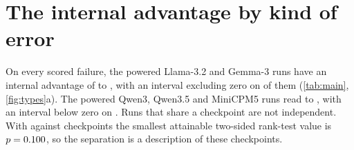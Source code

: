 \section{The internal advantage by kind of error}
\label{sec:result}

\begin{table}[t]
\centering
\footnotesize
\setlength{\tabcolsep}{1.5pt}
\caption{Every run under the corrected labels. $n_+$ and $n_-$ are the labelled failures and valid calls in the scored population. The AUC columns are the length floor, the mean log-probability (conf.), the output-only judge, the Qwen3.5-0.8B reader and the token-role probe, all on every scored failure. The last four columns are differences of AUC on held-out tools: probe minus confidence on every scored failure with its 95\% tool-resampled interval, probe minus the output-only judge on every scored failure, and probe minus confidence on wrong argument values and on dropped parallel calls within the parallel categories, each against valid calls. $^{\circ}$ the interval excludes zero (intervals in \cref{app:judges,app:types}). n.c.\ not computed: too few failures of that kind or of valid parallel calls, an underpowered run, or a comparator not fitted on that run. $^{*}$ re-extracted under the corrected extractor. $^\dagger$ fewer than thirty items of one class.}
\label{tab:main}

\end{table}

On every scored failure, the \nRunsInternals{} powered Llama-3.2 and Gemma-3 runs have an internal advantage of \gapInternalsMin{} to \gapInternalsMax{}, with an interval excluding zero on \nInternalsCiExcludesZero{} of them (\cref{tab:main}, \cref{fig:types}a). The \nRunsConfidence{} powered Qwen3, Qwen3.5 and MiniCPM5 runs read \gapConfidenceMin{} to \gapConfidenceMax{}, with an interval below zero on \nConfidenceCiBelowZero{}. Runs that share a checkpoint are not independent. With \nCkptInternals{} against \nCkptConfidence{} checkpoints the smallest attainable two-sided rank-test value is $p=0.100{}$, so the separation is a description of these \nCkpt{} checkpoints.


